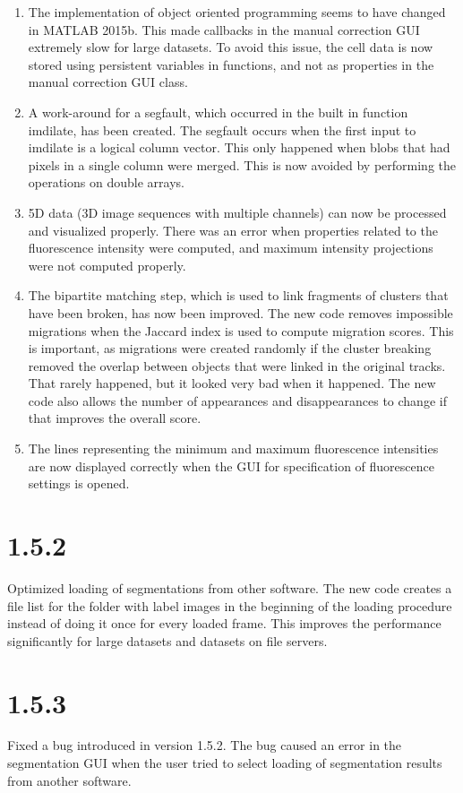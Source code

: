 \documentclass[a4paper, oneside, onecolumn, 11pt]{article}
\begin{document}
\begin{enumerate}
  \item The implementation of object oriented programming seems to have changed in MATLAB 2015b. This made callbacks in the manual correction GUI extremely slow for large datasets. To avoid this issue, the cell data is now stored using persistent variables in functions, and not as properties in the manual correction GUI class.
  \item A work-around for a segfault, which occurred in the built in function imdilate, has been created. The segfault occurs when the first input to imdilate is a logical column vector. This only happened when blobs that had pixels in a single column were merged. This is now avoided by performing the operations on double arrays.
  \item 5D data (3D image sequences with multiple channels) can now be processed and visualized properly. There was an error when properties related to the fluorescence intensity were computed, and maximum intensity projections were not computed properly.
  \item The bipartite matching step, which is used to link fragments of clusters that have been broken, has now been improved. The new code removes impossible migrations when the Jaccard index is used to compute migration scores. This is important, as migrations were created randomly if the cluster breaking removed the overlap between objects that were linked in the original tracks. That rarely happened, but it looked very bad when it happened. The new code also allows the number of appearances and disappearances to change if that improves the overall score.
  \item The lines representing the minimum and maximum fluorescence intensities are now displayed correctly when the GUI for specification of fluorescence settings is opened.
\end{enumerate}

\section*{1.5.2}
Optimized loading of segmentations from other software. The new code creates a file list for the folder with label images in the beginning of the loading procedure instead of doing it once for every loaded frame. This improves the performance significantly for large datasets and datasets on file servers.

\section*{1.5.3}
Fixed a bug introduced in version 1.5.2. The bug caused an error in the segmentation GUI when the user tried to select loading of segmentation results from another software.
\end{document}
